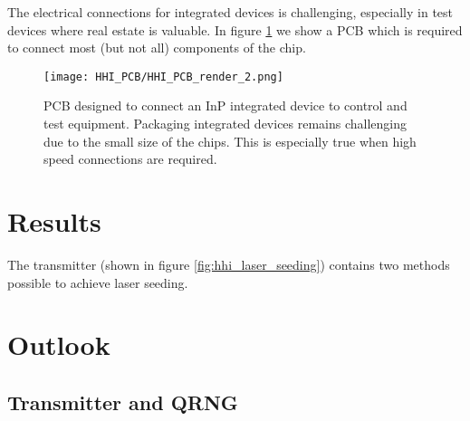 The electrical connections for integrated devices is challenging, especially in test devices where real estate is valuable. In figure \ref{fig:hhi_pcb} we show a PCB which is required to connect most (but not all) components of the chip. 

\begin{figure}[tbp]
	\texttt{[image: HHI\_PCB/HHI\_PCB\_render\_2.png]}
	\caption[PCB breakout for an InP integrated circuit]{PCB designed to connect an \ac{InP} integrated device to control and test equipment. Packaging integrated devices remains challenging due to the small size of the chips. This is especially true when high speed connections are required.}
	\label{fig:hhi_pcb}
\end{figure}

\section{Results}

The transmitter (shown in figure \ref{fig:hhi_laser_seeding}) contains two methods possible to achieve laser seeding.

\section{Outlook}

\subsection{Transmitter and QRNG}

